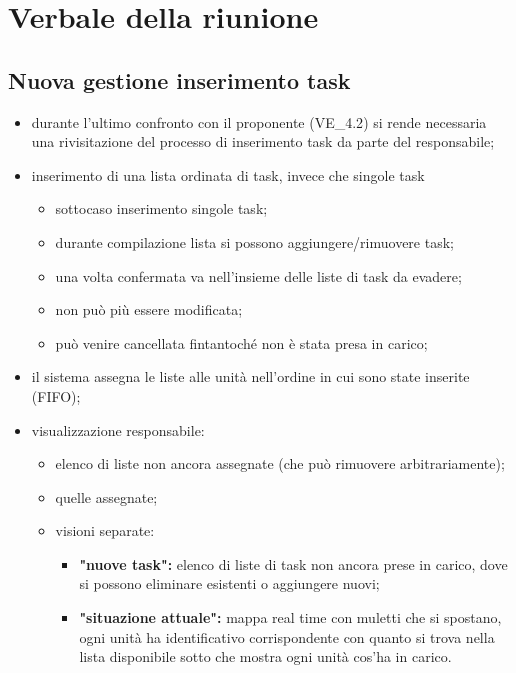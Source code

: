\section{Verbale della riunione}

\subsection{Nuova gestione inserimento task}
\label{newtask}
    \begin{itemize}
        \item durante l'ultimo confronto con il proponente (\textsc{VE\_4.2}) si rende necessaria una rivisitazione del processo di inserimento task da parte del responsabile;
        \item inserimento di una lista ordinata di task, invece che singole task
        \begin{itemize}
            \item sottocaso inserimento singole task;
            \item durante compilazione lista si possono aggiungere/rimuovere task;
            \item una volta confermata va nell'insieme delle liste di task da evadere;
            \item non può più essere modificata;
            \item può venire cancellata fintantoché non è stata presa in carico;
        \end{itemize}
        \item il sistema assegna le liste alle unità nell'ordine in cui sono state inserite (FIFO);
        \item visualizzazione responsabile:
            \begin{itemize}
                \item elenco di liste non ancora assegnate (che può rimuovere arbitrariamente);

                \item quelle assegnate;

                \item visioni separate:
                \begin{itemize}
                    \item \textbf{"nuove task": }elenco di liste di task non ancora prese in carico, dove si possono eliminare esistenti  o aggiungere nuovi;
                    \item \textbf{"situazione attuale": } mappa real time con muletti che si spostano, ogni unità ha identificativo corrispondente con quanto si trova nella lista disponibile sotto che mostra ogni unità cos'ha in carico.
                \end{itemize}
            \end{itemize}
    \end{itemize}
